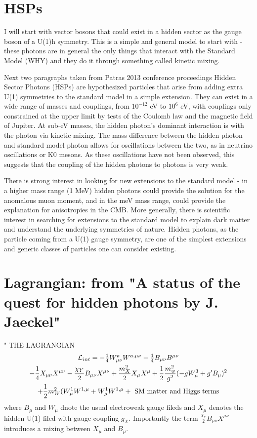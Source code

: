 \documentclass[11pt]{book}
\begin{document}
\section{HSPs}

I will start with vector bosons that could exist in a hidden sector as the gauge boson of a U(1)h symmetry. This is a simple and general model to start with - these photons are in general the only things that interact with the Standard Model (WHY) and they do it through something called kinetic mixing.

{\color{blue} Next two paragraphs taken from Patras 2013 conference proceedings}
Hidden Sector Photons (HSPs)  are hypothesized particles that arise from adding extra U(1) symmetries to the standard model in a simple extension. They can exist in a wide range of masses and couplings, from $10^{-12}$ eV to $10^6$ eV, with couplings only constrained at the upper limit by tests of the Coulomb law and the magnetic field of Jupiter. At sub-eV masses, the hidden photon's dominant interaction is with the photon via kinetic mixing. The mass difference between the hidden photon and standard model photon allows for oscillations between the two, as in neutrino oscillations or K0 mesons. As these oscillations have not been observed, this suggests that the coupling of the hidden photons to photons is very weak.

There is strong interest in looking for new extensions to the standard model - in a higher mass range (1 MeV) hidden photons could provide the solution for the anomalous muon moment, and in the meV mass range, could provide the explanation for anisotropies in the CMB. More generally, there is scientific interest in searching for extensions to the standard model to explain dark matter and understand the underlying symmetries of nature. Hidden photons, as the particle coming from a U(1) gauge symmetry, are one of the simplest extensions and generic classes of particles one can consider existing. 


\section{Lagrangian: from "A status of the quest for hidden photons by J. Jaeckel"}
" 
THE LAGRANGIAN
\begin{multline}
$$\mathcal{L}_{int} = -\frac{1}{4}W_{\mu\nu}^aW^{a,\mu\nu}-\frac{1}{4}B_{\mu\nu}B^{\mu\nu} \\ - \frac{1}{4}X_{\mu\nu}X^{\mu\nu} - \frac{\chi_Y}{2}B_{\mu\nu}X^{\mu\nu} + \frac{m_X^2}{2}X_{\mu}X^{\mu}+\frac{1}{2}\frac{m_w^2}{g^2}(-gW_{\mu}^3 + g'B_{\mu})^2 \\ +\frac{1}{2}m_W^2(W_{\mu}^1W^{1,\mu}+W_{\mu}^1W^{1,\mu}+\text{ SM matter and Higgs terms}  $$
\end{multline}
where $B_{\mu}$ and $W_{\mu}$ dnote the usual electroweak gauge fileds and $X_{\mu}$ denotes the hidden U(1) filed with gauge coupling $g_X$. Importantly the term $ \frac{\chi_Y}{2}B_{\mu\nu}X^{\mu\nu} $ introduces a mixing between $X_{\mu}$ and $B_{\mu}$.
\end{document}
